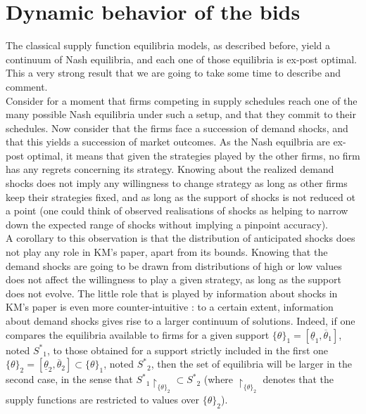 \section{Dynamic behavior of the bids} \label{dynamics}
The classical supply function equilibria models, as described before, yield a continuum of Nash equilibria, and each one of those equilibria is ex-post optimal. This a very strong result that we are going to take some time to describe and comment.\\

Consider for a moment that firms competing in supply schedules reach one of the many possible Nash equilibria under such a setup, and that they commit to their schedules. Now consider that the firms face a succession of demand shocks, and that this yields a succession of market outcomes. As the Nash equilbria are ex-post optimal, it means that given the strategies played by the other firms, no firm has any regrets concerning its strategy. Knowing about the realized demand shocks does not imply any willingness to change strategy as long as other firms keep their strategies fixed, and as long as the support of shocks is not reduced ot a point (one could think of observed realisations of shocks as helping to narrow down the expected range of shocks without implying a pinpoint accuracy).\\

A corollary to this observation is that the distribution of anticipated shocks does not play any role in KM's paper, apart from its bounds. Knowing that the demand shocks are going to be drawn from distributions of high or low values does not affect the willingness to play a given strategy, as long as the support does not evolve. The little role that is played by information about shocks in KM's paper is even more counter-intuitive : to a certain extent, information about demand shocks gives rise to a larger continuum of solutions. Indeed, if one compares the equilibria available to firms for a given support $\{\theta\}_1=[\underline{\theta}_1, \overline{\theta}_1]$, noted ${S^*}_1$, to those obtained for a support strictly included in the first one $\{\theta\}_2=[\underline{\theta}_2, \overline{\theta}_2]\subset\{\theta\}_1$, noted ${S^*}_2$, then the set of equilibria will be larger in the second case, in the sense that $ {S^*}_1\restriction_{\{\theta\}_2}\subset {S^*}_2$ (where $\restriction_{\{\theta\}_2}$ denotes that the supply functions are restricted to values over $\{\theta\}_2$). \\

